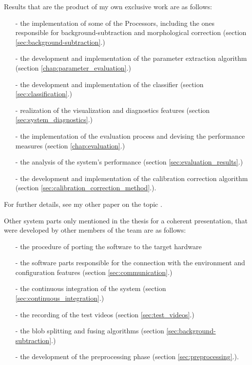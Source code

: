 \noindent Results that are the product of my own exclusive work are as follows:
\begin{itemize}
	\item[-] the implementation of some of the Processors, including the ones responsible for background-subtraction and morphological correction (section \ref{sec:background-subtraction}.)
	\item[-] the development and implementation of the parameter extraction algorithm (section \ref{chap:parameter_evaluation}.)
	\item[-] the development and implementation of the classifier (section \ref{sec:classification}.)
	\item[-] realization of the visualization and diagnostics features (section \ref{sec:system_diagnostics}.)
	\item[-] the implementation of the evaluation process and devising the performance measures (section \ref{chap:evaluation}.)
	\item[-] the analysis of the system's performance (section \ref{sec:evaluation_results}.)
	\item[-] the development and implementation of the calibration correction algorithm (section \ref{sec:calibration_correction_method}.).
\end{itemize}
For further details, see my other paper on the topic \cite{Barancsuk2016}.

\noindent Other system parts only mentioned in the thesis for a coherent presentation, that were developed by other members of the team are as follows:
\begin{itemize}
	\item[-] the procedure of porting the software to the target hardware
	\item[-] the software parts responsible for the connection with the environment and configuration features (section \ref{sec:communication}.)
	\item[-] the continuous integration of the system (section \ref{sec:continuous_integration}.)
	\item[-] the recording of the test videos (section \ref{sec:test_videos}.)
	\item[-] the blob splitting and fusing algorithms (section \ref{sec:background-subtraction}.)
	\item[-] the development of the preprocessing phase (section \ref{sec:preprocessing}.).
\end{itemize}


